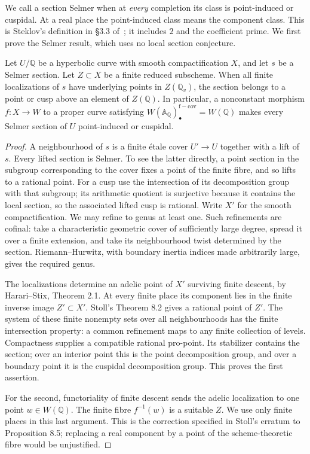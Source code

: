 We call a section Selmer when at \emph{every} completion
its class is point-induced or cuspidal. At a real
place the point-induced class means the component
class. This is Steklov's definition in \S3.3
of~\cite{Steklov2026}; it includes $2$ and the
coefficient prime. We first prove the Selmer result,
which uses no local section conjecture.

\begin{lemma}
\label{E-finite-support}
Let $U/\mathbb Q$ be a hyperbolic curve with smooth
compactification $X$, and let $s$ be a Selmer section.
Let $Z\subset X$ be a finite reduced subscheme.
When all finite localizations of $s$ have underlying
points in $Z(\mathbb Q_v)$, the section belongs to
a point or cusp above an element of $Z(\mathbb Q)$.
In particular, a nonconstant morphism
$f:X\to W$ to a proper curve satisfying
$W(\mathbb A_{\mathbb Q})_\bullet^{\mathrm{f-cov}}=W(\mathbb Q)$
makes every Selmer section of $U$ point-induced or cuspidal.
\end{lemma}
\begin{proof}
A neighbourhood of $s$ is a finite étale cover
$U'\to U$ together with a lift of $s$.
Every lifted section is Selmer. To see the latter
directly, a point section in the subgroup corresponding
to the cover fixes a point of the finite fibre,
and so lifts to a rational point. For a cusp use the
intersection of its decomposition group with that
subgroup; its arithmetic quotient is surjective
because it contains the local section, so the
associated lifted cusp is rational.
Write $X'$ for the smooth compactification. We may
refine to genus at least one. Such refinements are
cofinal: take a characteristic geometric cover of
sufficiently large degree, spread it over a finite
extension, and take its neighbourhood twist determined
by the section. Riemann--Hurwitz, with boundary
inertia indices made arbitrarily large, gives the
required genus.

The localizations determine an adelic point of $X'$
surviving finite descent, by Harari--Stix,
Theorem 2.1. At every finite place its component
lies in the finite inverse image $Z'\subset X'$.
Stoll's Theorem 8.2 gives a rational point of $Z'$.
The system of these finite nonempty sets over all
neighbourhoods has the finite intersection property:
a common refinement maps to any finite collection
of levels. Compactness supplies a compatible
rational pro-point. Its stabilizer contains the
section; over an interior point this is the point
decomposition group, and over a boundary point it
is the cuspidal decomposition group. This proves
the first assertion.

For the second, functoriality of finite descent
sends the adelic localization to one point
$w\in W(\mathbb Q)$. The finite fibre $f^{-1}(w)$
is a suitable $Z$.
We use only finite places in this last argument.
This is the correction specified in Stoll's erratum
to Proposition 8.5; replacing a real component by
a point of the scheme-theoretic fibre would be
unjustified.
\end{proof}

